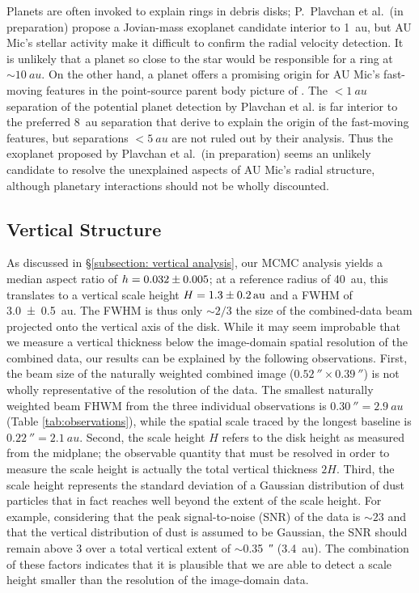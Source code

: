 \documentclass[modern]{aastex62}
\begin{document}
Planets are often invoked to explain rings in debris disks; P.~Plavchan et al.~(in preparation) propose a Jovian-mass exoplanet candidate interior to \SI{1}{au}, but AU Mic's stellar activity make it difficult to confirm the radial velocity detection.
It is unlikely that a planet so close to the star would be responsible for a ring at $\sim\SI{10}{au}$.
On the other hand, a planet offers a promising origin for AU Mic's fast-moving features in the point-source parent body picture of \citet{sezestre17}.
The $< \SI{1}{au}$ separation of the potential planet detection by Plavchan et al. is far interior to the preferred \SI{8}{au} separation that \citet{sezestre17} derive to explain the origin of the fast-moving features, but separations $< \SI{5}{au}$ are not ruled out by their analysis.
Thus the exoplanet proposed by Plavchan et al.~(in preparation) seems an unlikely candidate to resolve the unexplained aspects of AU Mic's radial structure, although planetary interactions should not be wholly discounted.

\subsection{Vertical Structure}
\label{subsection: vertical discussion}

As discussed in \S \ref{subsection: vertical analysis}, our MCMC analysis yields a median aspect ratio of $h=\num{0.032 \pm 0.005}$; at a reference radius of \SI{40}{au}, this translates to a vertical scale height $H = \SI{1.3 \pm 0.2}{au}$ and a FWHM of \SI{3.0 \pm 0.5}{au}.
The FWHM is thus only $\sim 2/3$ the size of the combined-data beam projected onto the vertical axis of the disk.
While it may seem improbable that we measure a vertical thickness below the image-domain spatial resolution of the combined data, our results can be explained by the following observations.
First, the beam size of the naturally weighted combined image ($\SI{0.52}{\arcsecond} \times \SI{0.39}{\arcsecond}$) is not wholly representative of the resolution of the data. 
The smallest naturally weighted beam FHWM from the three individual observations is $\SI{0.30}{\arcsecond} = \SI{2.9}{au}$ (Table \ref{tab:observations}), while the spatial scale traced by the longest baseline is $\SI{0.22}{\arcsecond} = \SI{2.1}{au}$.
Second, the scale height $H$ refers to the disk height as measured from the midplane; the observable quantity that must be resolved in order to measure the scale height is actually the total vertical thickness $2H$.
Third, the scale height represents the standard deviation of a Gaussian distribution of dust particles that in fact reaches well beyond the extent of the scale height.
For example, considering that the peak signal-to-noise (SNR) of the data is $\sim 23$ and that the vertical distribution of dust is assumed to be Gaussian, the SNR should remain above 3 over a total vertical extent of $\sim$\SI{0.35}{\arcsecond} (\SI{3.4}{au}). 
The combination of these factors indicates that it is plausible that we are able to detect a scale height smaller than the resolution of the image-domain data.
\end{document}
